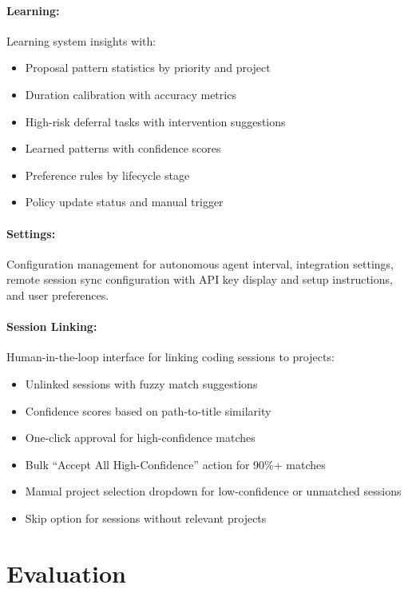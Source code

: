 \documentclass[11pt,a4paper]{article}
\begin{document}
\paragraph{Learning:} Learning system insights with:
\begin{itemize}
    \item Proposal pattern statistics by priority and project
    \item Duration calibration with accuracy metrics
    \item High-risk deferral tasks with intervention suggestions
    \item Learned patterns with confidence scores
    \item Preference rules by lifecycle stage
    \item Policy update status and manual trigger
\end{itemize}

\paragraph{Settings:} Configuration management for autonomous agent interval, integration settings, remote session sync configuration with API key display and setup instructions, and user preferences.

\paragraph{Session Linking:} Human-in-the-loop interface for linking coding sessions to projects:
\begin{itemize}
    \item Unlinked sessions with fuzzy match suggestions
    \item Confidence scores based on path-to-title similarity
    \item One-click approval for high-confidence matches
    \item Bulk ``Accept All High-Confidence'' action for 90\%+ matches
    \item Manual project selection dropdown for low-confidence or unmatched sessions
    \item Skip option for sessions without relevant projects
\end{itemize}

\section{Evaluation}
\label{sec:evaluation}
\end{document}
